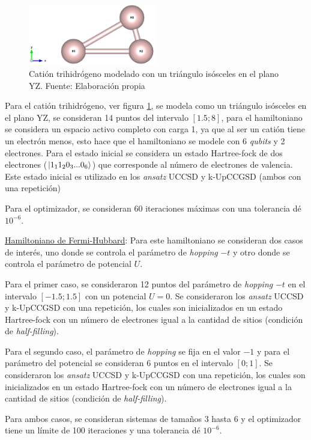 \begin{figure}[H]
\centering
\includegraphics[width=0.5\textwidth]{figures/S4/moleculas/3h.png}
\caption{\label{fig:3h} Catión trihidrógeno modelado con un triángulo isósceles en el plano YZ. Fuente: Elaboración propia} 
\end{figure}

Para el catión trihidrógeno, ver figura \ref{fig:3h}, se modela como un triángulo isósceles en el plano YZ, se consideran 14 puntos del intervalo $[1.5; 8]$, para el hamiltoniano se considera un espacio activo completo con carga 1, ya que al ser un catión tiene un electrón menos, esto hace que el hamiltoniano se modele con 6 \textit{qubits} y 2 electrones. Para el estado inicial se considera un estado Hartree-fock de dos electrones ($\ket{1_11_20_3...0_{6}}$) que corresponde al número de electrones de valencia. Este estado inicial es utilizado en los \textit{ansatz} UCCSD y k-UpCCGSD (ambos con una repetición)

Para el optimizador, se consideran $60$ iteraciones máximas con una tolerancia dé $10^{-6}$.

\underline{Hamiltoniano de Fermi-Hubbard}: 
Para este hamiltoniano se consideran dos casos de interés, uno donde se controla el parámetro de \textit{hopping} $-t$ y otro donde se controla el parámetro de potencial $U$.

Para el primer caso, se consideraron 12 puntos del parámetro de \textit{hopping} $-t$ en el intervalo $[-1.5; 1.5]$ con un potencial $U=0$. Se consideraron los \textit{ansatz} UCCSD y k-UpCCGSD con una repetición, los cuales son inicializados en un estado Hartree-fock con un número de electrones igual a la cantidad de sitios (condición de \textit{half-filling}).

Para el segundo caso, el parámetro de \textit{hopping} se fija en el valor $-1$ y para el parámetro del potencial se consideran 6 puntos en el intervalo $[0;1]$. Se consideraron los \textit{ansatz} UCCSD y k-UpCCGSD con una repetición, los cuales son inicializados en un estado Hartree-fock con un número de electrones igual a la cantidad de sitios (condición de \textit{half-filling}).

Para ambos casos, se consideran sistemas de tamaños $3$ hasta $6$ y el optimizador tiene un límite de 100 iteraciones y una tolerancia dé $10^{-6}$.

